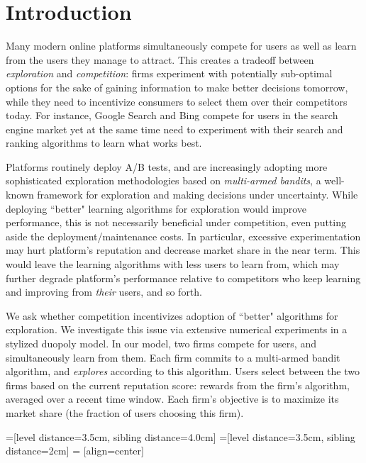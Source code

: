 \documentclass[../competing_bandits.tex]{subfiles}
\begin{document}
\section{Introduction}\label{section:1}

Many modern online platforms simultaneously compete for users as well as learn from the users they manage to attract. This creates a tradeoff between \textit{exploration} and \textit{competition}: firms experiment with potentially sub-optimal options for the sake of gaining information to make better decisions tomorrow, while they need to incentivize consumers to select them over their competitors today. For instance, Google Search and Bing compete for users in the search engine market yet at the same time need to experiment with their search and ranking algorithms to learn what works best.

Platforms routinely deploy A/B tests, and are increasingly adopting  more sophisticated exploration methodologies based on \emph{multi-armed bandits}, a well-known framework for exploration and making decisions under uncertainty. While deploying ``better" learning algorithms for exploration would improve performance, this is not necessarily beneficial under competition, even putting aside the deployment/maintenance costs. In particular, excessive experimentation may hurt platform's reputation and decrease market share in the near term. This would leave the learning algorithms with less users to learn from, which may further degrade platform's performance relative to competitors who keep learning and improving from \emph{their} users, and so forth.

We ask whether competition incentivizes adoption of ``better" algorithms for exploration. We investigate this issue via extensive numerical experiments in a stylized duopoly model. In our model, two firms compete for users, and simultaneously learn from them. Each firm commits to a multi-armed bandit algorithm, and \emph{explores} according to this algorithm. Users select between the two firms based on the current reputation score: rewards from the firm's algorithm, averaged over a recent time window. Each firm's objective is to maximize its market share (the fraction of users choosing this firm).

=[level distance=3.5cm, sibling distance=4.0cm]
=[level distance=3.5cm, sibling distance=2cm]
 = [align=center]
\end{document}

